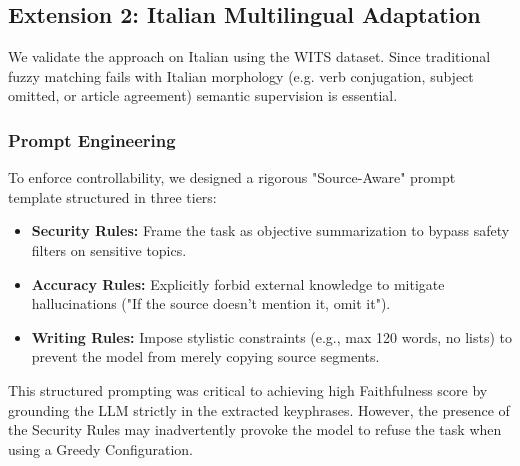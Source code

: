 \documentclass[conference]{IEEEtran}
\begin{document}
\subsection{Extension 2: Italian Multilingual Adaptation} \label{sec:italian}
We validate the approach on Italian using the WITS dataset. Since traditional fuzzy matching fails with Italian morphology (e.g. verb conjugation, subject omitted, or article agreement) semantic supervision is essential.

\subsubsection{Prompt Engineering}
To enforce controllability, we designed a rigorous "Source-Aware" prompt template structured in three tiers:
\begin{itemize}
    \item \textbf{Security Rules:} Frame the task as objective summarization to bypass safety filters on sensitive topics.
    \item \textbf{Accuracy Rules:} Explicitly forbid external knowledge to mitigate hallucinations ("If the source doesn't mention it, omit it").
    \item \textbf{Writing Rules:} Impose stylistic constraints (e.g., max 120 words, no lists) to prevent the model from merely copying source segments.
\end{itemize}
This structured prompting was critical to achieving high Faithfulness score by grounding the LLM strictly in the extracted keyphrases. However, the presence of the Security Rules may inadvertently provoke the model to refuse the task when using a Greedy Configuration.
\end{document}
